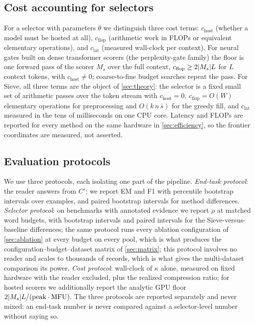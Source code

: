 \documentclass[pdflatex,sn-basic]{sn-jnl}
\DeclarePairedDelimiter\abs{\lvert}{\rvert}
\theoremstyle{remark}
\newcommand{\method}{Sieve}
\begin{document}
\subsection{Cost accounting for selectors}
For a selector with parameters $\theta$ we distinguish three cost
terms: $c_{\mathrm{host}}$ (whether a model must be hosted at all),
$c_{\mathrm{flop}}$ (arithmetic work in FLOPs or equivalent elementary
operations), and $c_{\mathrm{lat}}$ (measured wall-clock per context).
For neural gates built on dense transformer scorers (the
perplexity-gate family) the floor is one forward pass of the scorer
$M_s$ over the full context, $c_{\mathrm{flop}} \ge 2\abs{M_s} L$ for
$L$ context tokens, with $c_{\mathrm{host}} \ne 0$; coarse-to-fine
budget searches repeat the pass. For \method{}, all three terms are the
object of \autoref{sec:theory}: the selector is a fixed small set of
arithmetic passes over the token stream with
$c_{\mathrm{host}} = 0$, $c_{\mathrm{flop}} = O(W)$ elementary
operations for preprocessing and $O(k\,n\,\bar{s})$ for the greedy
fill, and $c_{\mathrm{lat}}$ measured in the tens of milliseconds on
one CPU core. Latency and FLOPs are reported for every method on the
same hardware in \autoref{sec:efficiency}, so the frontier
coordinates are measured, not asserted.

\subsection{Evaluation protocols}
\label{sec:protocols}
We use three protocols, each isolating one part of the pipeline.
\emph{End-task protocol}: the reader answers from $C'$; we report EM
and F1 with percentile bootstrap intervals over examples, and paired
bootstrap intervals for method differences. \emph{Selector protocol}:
on benchmarks with annotated evidence we report $\rho$ at matched word
budgets, with bootstrap intervals and paired intervals for the
\method{}-versus-baseline differences; the same protocol runs every
ablation configuration of \autoref{sec:ablation} at every budget on
every pool, which is what produces the
configuration--budget--dataset matrix of \autoref{sec:matrix}; this
protocol involves no
reader and scales to thousands of records, which is what gives the
multi-dataset comparison its power. \emph{Cost protocol}: wall-clock
of $\kappa$ alone, measured on fixed hardware with the reader
excluded, plus the realized compression ratio; for hosted scorers we
additionally report the analytic GPU floor
$2\abs{M_s} L / (\text{peak} \cdot \mathrm{MFU})$. The three protocols
are reported separately and never mixed: an end-task number is never
compared against a selector-level number without saying so.
\end{document}
